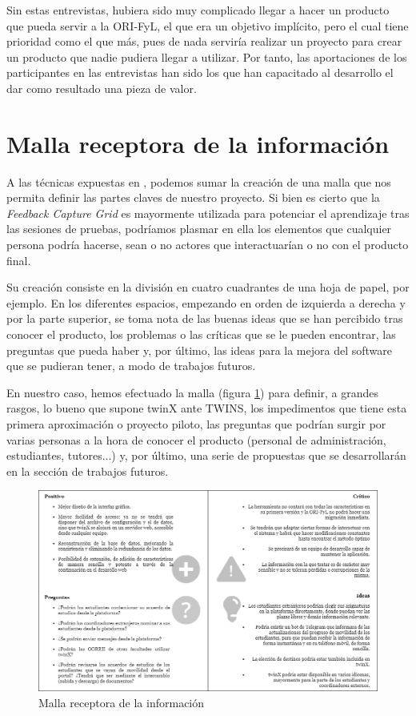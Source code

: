 Sin estas entrevistas, hubiera sido muy complicado llegar a hacer un producto que pueda servir a la ORI-FyL, el que era un objetivo implícito, pero el cual tiene prioridad como el que más, pues de nada serviría realizar un proyecto para crear un producto que nadie pudiera llegar a utilizar. Por tanto, las aportaciones de los participantes en las entrevistas han sido los que han capacitado al desarrollo el dar como resultado una pieza de valor.

\section{Malla receptora de la información}

A las técnicas expuestas en , podemos sumar la creación de una malla que nos permita definir las partes claves de nuestro proyecto. Si bien es cierto que la \textit{Feedback Capture Grid} es mayormente utilizada para potenciar el aprendizaje tras las sesiones de pruebas, podríamos plasmar en ella los elementos que cualquier persona podría hacerse, sean o no actores que interactuarían o no con el producto final. \citep{feedbackCaptureGrid}

Su creación consiste en la división en cuatro cuadrantes de una hoja de papel, por ejemplo. En los diferentes espacios, empezando en orden de izquierda a derecha y por la parte superior, se toma nota de las buenas ideas que se han percibido tras conocer el producto, los problemas o las críticas que se le pueden encontrar, las preguntas que pueda haber y, por último, las ideas para la mejora del software que se pudieran tener, a modo de trabajos futuros.

En nuestro caso, hemos efectuado la malla (figura \ref{fig:malla}) para definir, a grandes rasgos, lo bueno que supone twinX ante TWINS, los impedimentos que tiene esta primera aproximación o proyecto piloto, las preguntas que podrían surgir por varias personas a la hora de conocer el producto (personal de administración, estudiantes, tutores...) y, por último, una serie de propuestas que se desarrollarán en la sección de trabajos futuros.


\begin{figure}
	\centering
	\includegraphics[width=\textwidth]{img/malla.png}
	\caption{Malla receptora de la información}
	\label{fig:malla}
\end{figure}


